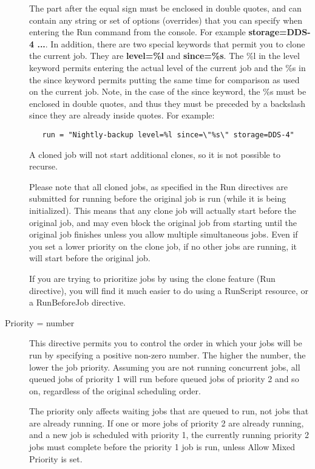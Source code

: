 \begin{description}
   The part after the equal sign must be enclosed in double quotes,
   and can contain any string or set of options (overrides) that you
   can specify when entering the Run command from the console. For
   example {\bf storage=DDS-4 ...}.  In addition, there are two special
   keywords that permit you to clone the current job. They are {\bf level=\%l}
   and {\bf since=\%s}. The \%l in the level keyword permits 
   entering the actual level of the current job and the \%s in the since
   keyword permits putting the same time for comparison as used on the
   current job.  Note, in the case of the since keyword, the \%s must be
   enclosed in double quotes, and thus they must be preceded by a backslash
   since they are already inside quotes. For example:

\begin{verbatim}
   run = "Nightly-backup level=%l since=\"%s\" storage=DDS-4"
\end{verbatim}

   A cloned job will not start additional clones, so it is not
   possible to recurse.

   Please note that all cloned jobs, as specified in the Run directives are
   submitted for running before the original job is run (while it is being
   initialized). This means that any clone job will actually start before
   the original job, and may even block the original job from starting
   until the original job finishes unless you allow multiple simultaneous
   jobs.  Even if you set a lower priority on the clone job, if no other
   jobs are running, it will start before the original job.

   If you are trying to prioritize jobs by using the clone feature (Run
   directive), you will find it much easier to do using a RunScript
   resource, or a RunBeforeJob directive.

\label{Priority}
\item [Priority = \lt{}number\gt{}]
   This directive permits you to control the order in which your jobs will
   be run by specifying a positive non-zero number. The higher the number,
   the lower the job priority. Assuming you are not running concurrent jobs,
   all queued jobs of priority 1 will run before queued jobs of priority 2
   and so on, regardless of the original scheduling order.

   The priority only affects waiting jobs that are queued to run, not jobs
   that are already running.  If one or more jobs of priority 2 are already
   running, and a new job is scheduled with priority 1, the currently
   running priority 2 jobs must complete before the priority 1 job is
   run, unless Allow Mixed Priority is set.


\end{description}
